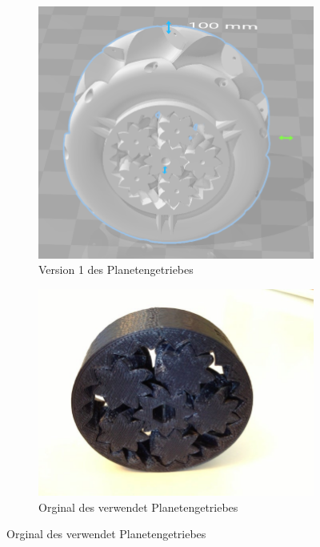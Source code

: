 \begin{figure}[!ht]
	\centering
	\begin{subfigure}[b]{0.4\textwidth}
		\includegraphics[width=\textwidth]{bilder/GetriebeVersion1-1.png}
		\caption{Version 1 des Planetengetriebes}
		\label{bild:gearversion1-1}
	\end{subfigure}
	\begin{subfigure}[b]{0.4\textwidth}
		\includegraphics[width=\textwidth]{bilder/GetriebeVersion1-2.jpg}
		\caption{Orginal des verwendet Planetengetriebes \cite{link:planetgear1}}
		\label{bild:gearversion1-2}
	\end{subfigure}
\end{figure}

